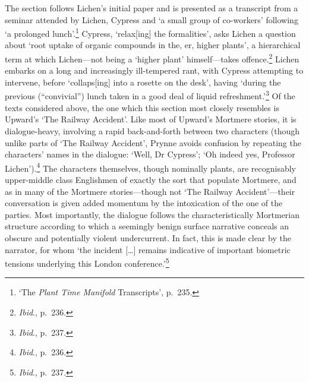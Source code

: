 \documentclass[]{article}
\begin{document}
The section follows Lichen’s initial paper and is presented as a
transcript from a seminar attended by Lichen, Cypress and ‘a small group
of co-workers’ following ‘a prolonged lunch’.\footnote{‘The \emph{Plant
  Time Manifold} Transcripts’, p.~235.} Cypress, ‘relax{[}ing{]} the
formalities’, asks Lichen a question about ‘root uptake of organic
compounds in the, er, higher plants’, a hierarchical term at which
Lichen—not being a ‘higher plant’ himself—takes offence.\footnote{\emph{Ibid}.,
  p.~236.} Lichen embarks on a long and increasingly ill-tempered rant,
with Cypress attempting to intervene, before ‘collaps{[}ing{]} into a
rosette on the desk’, having ‘during the previous (“convivial”) lunch
taken in a good deal of liquid refreshment.’\footnote{\emph{Ibid}.,
  p.~237.} Of the texts considered above, the one which this section
most closely resembles is Upward’s ‘The Railway Accident’. Like most of
Upward’s Mortmere stories, it is dialogue-heavy, involving a rapid
back-and-forth between two characters (though unlike parts of ‘The
Railway Accident’, Prynne avoids confusion by repeating the characters’
names in the dialogue: ‘Well, Dr Cypress’; ‘Oh indeed yes, Professor
Lichen’).\footnote{\emph{Ibid}., p.~236.} The characters themselves,
though nominally plants, are recognisably upper-middle class Englishmen
of exactly the sort that populate Mortmere, and as in many of the
Mortmere stories—though not ‘The Railway Accident’—their conversation is
given added momentum by the intoxication of the one of the parties. Most
importantly, the dialogue follows the characteristically Mortmerian
structure according to which a seemingly benign surface narrative
conceals an obscure and potentially violent undercurrent. In fact, this
is made clear by the narrator, for whom ‘the incident {[}\ldots{}{]}
remains indicative of important biometric tensions underlying this
London conference.’\footnote{\emph{Ibid}., p.~237.}
\end{document}

